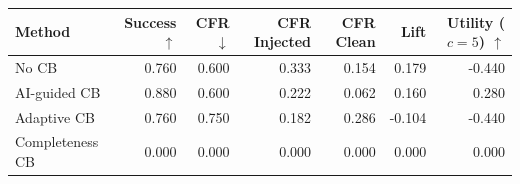 \begin{tabular}{lrrrrrr}
\toprule
Method & Success $\uparrow$ & CFR $\downarrow$ & CFR Injected & CFR Clean & Lift & Utility ($c=5$) $\uparrow$ \\
\midrule
No CB & 0.760 & 0.600 & 0.333 & 0.154 & 0.179 & -0.440 \\
AI-guided CB & 0.880 & 0.600 & 0.222 & 0.062 & 0.160 & 0.280 \\
Adaptive CB & 0.760 & 0.750 & 0.182 & 0.286 & -0.104 & -0.440 \\
Completeness CB & 0.000 & 0.000 & 0.000 & 0.000 & 0.000 & 0.000 \\
\bottomrule
\end{tabular}
